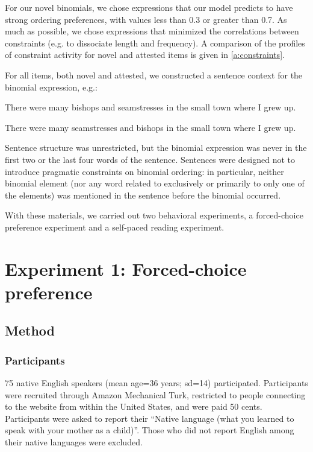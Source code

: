 \documentclass[authoryear]{elsarticle}
\begin{document}
For our novel binomials, we chose expressions that our model predicts to have strong ordering preferences, with values less than 0.3 or greater than 0.7. As much as possible, we chose expressions that minimized the correlations between constraints (e.g. to dissociate length and frequency). A comparison of the profiles of constraint activity for novel and attested items is given in \ref{a:constraints}.


For all items, both novel and attested, we constructed a sentence context for the binomial expression, e.g.:
\begin{exe}
\item There were many bishops and seamstresses in the small town where I grew up.
\item There were many seamstresses and bishops in the small town where I grew up.
\end{exe}
Sentence structure was unrestricted, but the binomial expression was never in the first two or the last four words of the sentence. Sentences were designed not to introduce pragmatic constraints on binomial ordering: in particular, neither binomial element (nor any word related to exclusively or primarily to only one of the elements) was mentioned in the sentence before the binomial occurred.

With these materials, we carried out two behavioral experiments, a forced-choice preference experiment and a self-paced reading experiment.


\section{Experiment 1: Forced-choice preference}\label{expt1}
\subsection{Method}
\subsubsection{Participants}
75 native English speakers (mean age=36 years; sd=14) participated. Participants were recruited through Amazon Mechanical Turk, restricted to people connecting to the website from within the United States, and were paid 50 cents. Participants were asked to report their ``Native language (what you learned to speak with your mother as a child)''. Those who did not report English among their native languages were excluded.
\end{document}
